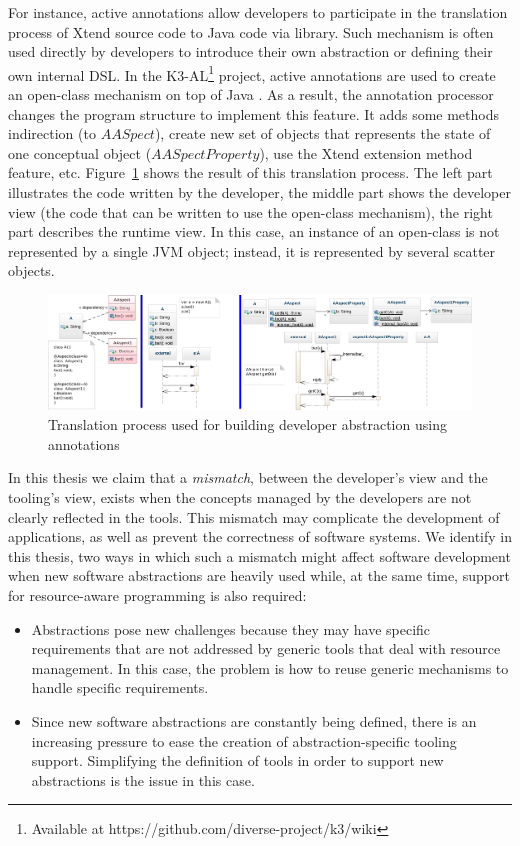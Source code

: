 For instance, active annotations allow developers to participate in the translation process of Xtend source code to Java code via library.
Such mechanism is often used directly by developers to introduce their own abstraction or defining their own internal DSL.
In the K3-AL\footnote{Available at https://github.com/diverse-project/k3/wiki} project, active annotations are used to create an open-class mechanism on top of Java \cite{Clifton:2000:MMO:353171.353181}. 
As a result, the annotation processor changes the program structure to implement this feature. 
It adds some methods indirection (to $AASpect$), create new set of objects that represents the state of one conceptual object ($AASpectProperty$), use the Xtend extension method feature, etc.
Figure~\ref{fig:k3-diagram} shows the result of this translation process. 
The left part illustrates the code written by the developer, the middle part shows the developer view (the code that can be written to use the open-class mechanism), the right part describes the runtime view.
In this case, an instance of an open-class is not represented by a single JVM object; instead, it is represented by several scatter objects.  

\begin{figure}
\centering
\includegraphics[width=0.9\linewidth]{chapter2/fig/famous}
\caption{Translation process used for building developer abstraction using annotations}
\label{fig:k3-diagram}
\end{figure}

In this thesis we claim that a \textit{mismatch}, between the developer's view and the tooling's view, exists when the concepts managed by the developers are not clearly reflected in the tools.
This mismatch may complicate the development of applications, as well as prevent the correctness of software systems.
We identify in this thesis, two ways in which such a mismatch might affect software development when new software abstractions are heavily used while, at the same time, support for resource-aware programming is also required:

\begin{itemize}
\item Abstractions pose new challenges because they may have specific requirements that are not addressed by generic tools that deal with resource management.
In this case, the problem is how to reuse generic mechanisms to handle specific requirements.

\item Since new software abstractions are constantly being defined, there is an increasing pressure to ease the creation of abstraction-specific tooling support.
Simplifying the definition of tools in order to support new abstractions is the issue in this case. 
\end{itemize}

